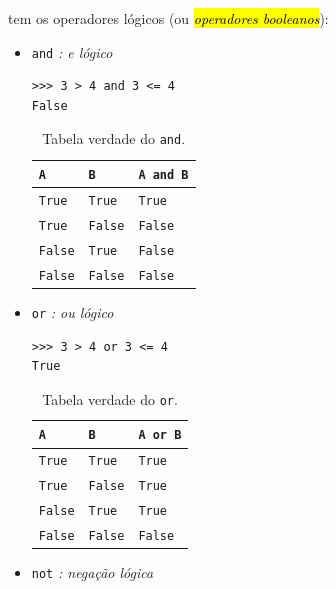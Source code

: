 {\python} tem os operadores lógicos (ou \hl{\emph{operadores booleanos}}):
\begin{itemize}
\item \lstinline+and+ \emph{: e lógico}

\begin{lstlisting}
>>> 3 > 4 and 3 <= 4
False
\end{lstlisting}

  \begin{table}[H]
    \centering
    \caption{Tabela verdade do \lstinline+and+.}
    \begin{tabular}{ll|l}
      \lstinline+A+ & \lstinline+B+ & \lstinline+A and B+\\\hline
      \lstinline+True+ & \lstinline+True+ & \lstinline+True+\\
      \lstinline+True+ & \lstinline+False+ & \lstinline+False+\\
      \lstinline+False+ & \lstinline+True+ & \lstinline+False+\\
      \lstinline+False+ & \lstinline+False+ & \lstinline+False+\\\hline
    \end{tabular}
  \end{table}

\item \lstinline+or+ \emph{: ou lógico}

\begin{lstlisting}
>>> 3 > 4 or 3 <= 4
True
\end{lstlisting}

  \begin{table}[H]
    \centering
    \caption{Tabela verdade do \lstinline+or+.}
    \begin{tabular}{ll|l}
      \lstinline+A+ & \lstinline+B+ & \lstinline+A or B+\\\hline
      \lstinline+True+ & \lstinline+True+ & \lstinline+True+\\
      \lstinline+True+ & \lstinline+False+ & \lstinline+True+\\
      \lstinline+False+ & \lstinline+True+ & \lstinline+True+\\
      \lstinline+False+ & \lstinline+False+ & \lstinline+False+\\\hline
    \end{tabular}
  \end{table}

\item \lstinline+not+ \emph{: negação lógica}


\end{itemize}
